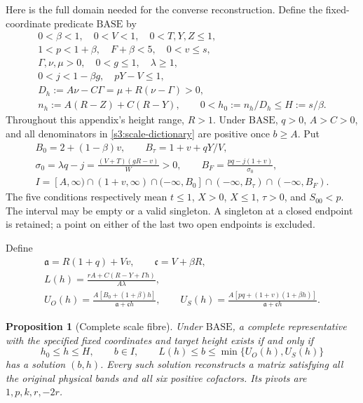 \documentclass[11pt,reqno]{amsart}
\newtheorem{proposition}[theorem]{Proposition}
\theoremstyle{definition}
\theoremstyle{remark}
\begin{document}
Here is the full domain needed for the converse reconstruction.
Define the fixed-coordinate predicate \(\mathrm{BASE}\) by
\begin{equation}\label{s3:BASE}
\begin{gathered}
 0<\beta<1,\quad0<V<1,\quad0<T,Y,Z\le1,\\
 1<p<1+\beta,\quad F+\beta<5,\quad0<v\le s,\\
 \Gamma,\nu,\mu>0,\quad0<g\le1,\quad\lambda\ge1,\\
 0<j<1-\beta g,\quad pY-V\le1,\\
 D_h:=A\nu-C\Gamma=\mu+R(\nu-\Gamma)>0,\\
 n_h:=A(R-Z)+C(R-Y),\qquad
 0<h_0:=n_h/D_h\le H:=s/\beta.
\end{gathered}
\end{equation}
Throughout this appendix's height range, \(R>1\). Under
\(\mathrm{BASE}\), \(q>0\), \(A>C>0\), and all denominators
in \eqref{s3:scale-dictionary} are positive once \(b\ge A\).
Put
\begin{equation}\label{s3:scale-interval}
\begin{gathered}
 B_0=2+(1-\beta)v,\qquad
 B_\tau=1+v+qY/V,\\
 \sigma_0=\lambda q-j
 =\frac{(V+T)(gR-v)}{W}>0,\qquad
 B_F=\frac{pq-j(1+v)}{\sigma_0},\\
 I=[A,\infty)\cap(1+v,\infty)\cap(-\infty,B_0]
       \cap(-\infty,B_\tau)\cap(-\infty,B_F).
\end{gathered}
\end{equation}
The five conditions respectively mean
\(t\le1\), \(X>0\), \(X\le1\), \(\tau>0\), and
\(S_{00}<p\). The interval may be empty or a valid singleton.
A singleton at a closed endpoint is retained; a point on either of
the last two open endpoints is excluded.

Define
\begin{equation}\label{s3:capacities-scale}
\begin{gathered}
 \mathfrak a=R(1+q)+Vv,\qquad\mathfrak c=V+\beta R,\\
 L(h)=\frac{rA+C(R-Y+\Gamma h)}{A\lambda},\\
 U_O(h)=\frac{A[B_0+(1+\beta)h]}{\mathfrak a+\mathfrak c h},
 \qquad
 U_S(h)=\frac{A[pq+(1+v)(1+\beta h)]}{\mathfrak a+\mathfrak c h}.
\end{gathered}
\end{equation}

\begin{proposition}[Complete scale fibre]\label{s3:scale-equivalence}
Under \(\mathrm{BASE}\), a complete representative with the
specified fixed coordinates and target height exists if and only if
\begin{equation}\label{s3:complete-fibre}
 h_0\le h\le H,\qquad b\in I,\qquad
 L(h)\le b\le\min\{U_O(h),U_S(h)\}
\end{equation}
has a solution \((b,h)\). Every such solution reconstructs a matrix
satisfying all the original physical bands and all six positive
cofactors. Its pivots are \(1,p,k,r,-2r\).
\end{proposition}
\end{document}
